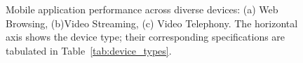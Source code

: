 \begin{figure}[h!]
     \caption{Mobile application performance across diverse devices: (a) Web Browsing, (b)Video Streaming, (c) Video Telephony. The horizontal axis shows the device type; their corresponding specifications are tabulated in Table~\ref{tab:device_types}.}
     \label{fig:motivation}
\end{figure}
